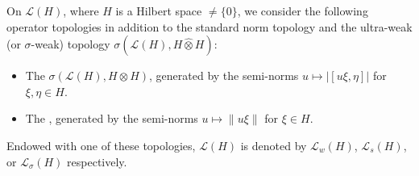 On $\mathcal{L}(H)$, where $H$ is a Hilbert space $\neq \{0\}$, we consider the following operator topologies in addition to the standard norm topology and the ultra-weak (or $\sigma$-weak) topology $\sigma(\mathcal{L}(H), H \hat{\otimes} H)$:
\begin{itemize}
\item The  $\sigma(\mathcal{L}(H), H \otimes H)$, generated by the semi-norms $u \mapsto |[u\xi, \eta]|$ for $\xi, \eta \in H$.
\item The , generated by the semi-norms $u \mapsto \|u\xi\|$ for $\xi \in H$.
\end{itemize}
Endowed with one of these topologies, $\mathcal{L}(H)$ is denoted by $\mathcal{L}_w(H)$, $\mathcal{L}_s(H)$, or $\mathcal{L}_\sigma(H)$ respectively.
